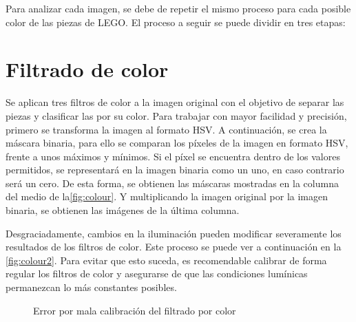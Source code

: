 Para analizar cada imagen, se debe de repetir el mismo proceso para cada posible color de las piezas de LEGO. El proceso a seguir se puede dividir en tres etapas:

\section{Filtrado de color}
\label{sec:Filtrado de color}
Se aplican tres filtros de color a la imagen original con el objetivo de separar las piezas y clasificar las por su color. Para trabajar con mayor facilidad y precisión, primero se transforma la imagen al formato HSV. A continuación, se crea la máscara binaria, para ello se comparan los píxeles de la imagen en formato HSV, frente a unos máximos y mínimos. Si el píxel se encuentra dentro de los valores permitidos, se representará en la imagen binaria como un uno, en caso contrario será un cero. De esta forma, se obtienen las máscaras mostradas en la columna del medio de la\autoref{fig:colour}. Y multiplicando la imagen original por la imagen binaria, se obtienen las imágenes de la última columna.

Desgraciadamente, cambios en la iluminación pueden modificar severamente los resultados de los filtros de color. Este proceso se puede ver a continuación en la \autoref{fig:colour2}. Para evitar que esto suceda, es recomendable calibrar de forma regular los filtros de color y asegurarse de que las condiciones lumínicas permanezcan lo más constantes posibles.

\begin{figure}[ht]  %
  \hfill	
  \hfill	
\caption{Error por mala calibración del filtrado por color}
\label{fig:colour2}
\vspace{-5pt}
\end{figure}

